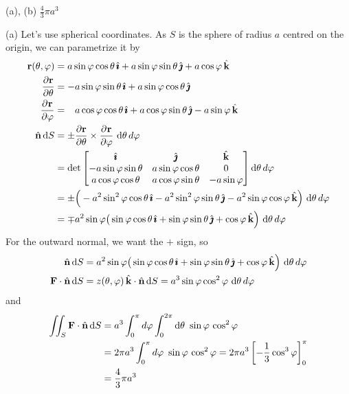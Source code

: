\begin{answer} 
(a), (b) $\frac{4}{3}\pi a^3$
\end{answer}

\begin{solution} 
(a) Let's use spherical coordinates. As $S$ is the
sphere of radius $a$ centred on the origin,  we can parametrize it by
\begin{align*}
\vr(\theta,\varphi) 
  &=a\sin\varphi\cos\theta\,\hi
     +a\sin\varphi\sin\theta\,\hj
     + a\cos\varphi\,\hk \\
\pdiff{\vr}{\theta}
   &=-a\sin\varphi\sin\theta\,\hi
     +a\sin\varphi\cos\theta\,\hj \\
\pdiff{\vr}{\varphi}
   &= \phantom{-}a\cos\varphi\cos\theta\,\hi
     +a\cos\varphi\sin\theta\,\hj
    -a\sin\varphi\,\hk \\
\hn\,\dee{S}
&=\pm\pdiff{\vr}{\theta}
   \times \pdiff{\vr}{\varphi}
    \ \dee{\theta}\, d\varphi\\
&=\det\left[\begin{matrix}   \hi &\hj &\hk \\
              -a\sin\varphi\sin\theta & a\sin\varphi\cos\theta & 0 \\
              a\cos\varphi\cos\theta & a\cos\varphi\sin\theta & -a\sin\varphi
   \end{matrix}\right]  \dee{\theta}\, d\varphi\\
&=\pm\Big(-a^2\sin^2\varphi\cos\theta\,\hi
          -a^2\sin^2\varphi\sin\theta\,\hj
          -a^2\sin\varphi\cos\varphi\,\hk\Big)\ \dee{\theta}\, d\varphi \\
&=\mp a^2\sin\varphi \big(\sin\varphi\cos\theta\,\hi
          +\sin\varphi\sin\theta\,\hj
          +\cos\varphi\,\hk\Big)\ \dee{\theta}\, d\varphi 
\end{align*}
For the outward normal, we want the $+$ sign, so
\begin{align*}
\hat{\mathbf{n}}\,\mathrm{d}S
&= a^2\sin\varphi \big(\sin\varphi\cos\theta\,\hat{\pmb{\imath}}
          +\sin\varphi\sin\theta\,\hat{\pmb{\jmath}}
          +\cos\varphi\,\hat{\mathbf{k}}\Big)\ \mathrm{d}\theta\, d\varphi  \\
\mathbf{F}\cdot \hat{\mathbf{n}}\,\mathrm{d}S &= z(\theta,\varphi)\,\hat{\mathbf{k}}\cdot \hat{\mathbf{n}}\,\mathrm{d}S
           = a^3 \sin\varphi\cos^2\varphi\ \mathrm{d}\theta\,d\varphi 
\end{align*}
and
\begin{align*}
\dblInt_S\vF\cdot \hn\,\dee{S}
&= a^3\int_0^\pi d\varphi\int_0^{2\pi}\dee{\theta}\ \sin\varphi\,\cos^2\varphi\\
&=2\pi a^3 \int_0^\pi d\varphi \ \sin\varphi\,\cos^2\varphi
=2\pi a^3\left[-\frac{1}{3}\cos^3\varphi\right]_0^\pi \\
&=\frac{4}{3}\pi a^3
\end{align*}


\end{solution}
